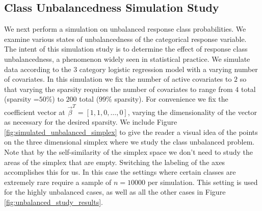 \subsection{Class Unbalancedness Simulation Study}
We next perform a simulation on unbalanced response class probabilities. We examine various states of unbalancedness of the categorical response variable. The intent of this simulation study is to determine the effect of response class unbalancedness, a phenomenon widely seen in statistical practice. We simulate data according to the $3$ category logistic regression model with a varying number of covariates. In this simulation we fix the number of active covariates to $2$ so that varying the sparsity requires the number of covariates to range from $4$ total (sparsity =$50\%$) to $200$ total ($99\%$ sparsity). For convenience we fix the coefficient vector at $\vec{\beta}^T =[1,1,0,\dots, 0]$, varying the dimensionality of the vector as necessary for the desired sparsity. We include Figure \ref{fig:simulated_unbalanced_simplex} to give the reader a visual idea of the points on the three dimensional simplex where we study the class unbalanced problem. Note that by the self-similarity of the simplex space we don't need to study the areas of the simplex that are empty. Switching the labeling of the axes accomplishes this for us. In this case the settings where certain classes are extremely rare require a sample of $n=10000$ per simulation. This setting is used for the highly unbalanced cases, as well as all the other cases in Figure \ref{fig:unbalanced_study_results}.


